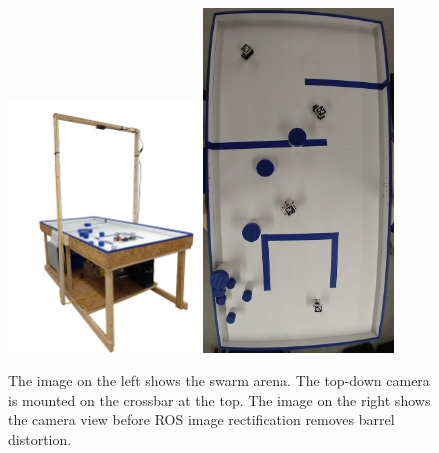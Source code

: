 \begin{figure}
	\centering
	\includegraphics[width=0.45\textwidth]{../swarm_table_no_bg_small}
	\includegraphics[width=0.45\textwidth]{../overhead_view}
	\caption{The image on the left shows the swarm arena. The top-down camera is mounted on the crossbar at the top. The image on the right shows the camera view before ROS image rectification removes barrel distortion.} 
	\label{fig:robot_arena}
\end{figure}

